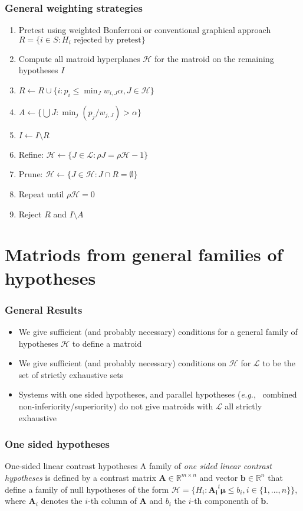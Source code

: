 \documentclass[bigger]{beamer}
\newcommand{\bs}[1]{\bm{#1}}
\newcommand{\eg}{{\em e.g.},~}
\begin{document}
\begin{frame}
\frametitle{General weighting strategies}

\begin{enumerate}
\item Pretest using weighted Bonferroni or conventional graphical
  approach $R = \{i \in S: H_i \textrm{ rejected by pretest}\}$
\item Compute all matroid hyperplanes $\mathscr{H}$ for the matroid on
  the remaining hypotheses $I$
\item $R \gets R \cup \{i: p_i \leq \min_J w_{i,J} \alpha, J \in \mathscr{H}\}$
\item $A \gets \{\bigcup J: \min_j (p_j / w_{j,J}) > \alpha\}$ 
\item $I \gets I \setminus R$
\item Refine: $\mathscr{H} \gets \{J\in \mathscr{L}: \rho J = \rho
  \mathscr{H} - 1\}$ 
\item Prune: $\mathscr{H} \gets \{J \in \mathscr{H}: J \cap R = \emptyset\}$
\item Repeat until $\rho \mathscr {H} = 0$
\item Reject $R$ and $I \setminus A$
\end{enumerate}
\end{frame}
\section{Matriods from general families of hypotheses}



\begin{frame}
\frametitle{General Results}
\begin{itemize}
\item We give sufficient (and probably necessary) conditions for a
  general family of hypotheses $\mathscr{H}$ to define a matroid
\item We give sufficient (and probably necessary) conditions on
  $\mathscr{H}$ for $\mathscr{L}$ to be the set of strictly exhaustive
  sets
\item Systems with one sided hypotheses, and parallel hypotheses (\eg
  combined non-inferiority/superiority) do not give matroids with
  $\mathscr{L}$ all strictly exhaustive 
\end{itemize}


\end{frame}

\begin{frame}
  \frametitle{One sided hypotheses}
  \begin{block}{One-sided linear contrast hypotheses}
    A family of {\em one sided linear contrast hypotheses} is defined
    by a contrast matrix $\bs{A} \in \mathbb{R}^{m\times n}$ and
    vector $\bs{b} \in \mathbb{R}^n$ that define a  family of null
    hypotheses of the form $\mathscr{H} = \{H_i: \bs{A_i}^t\bs{\mu}
    \leq b_i,i \in \{1,...,n\}\}$, where $\bs{A}_i$ denotes the $i$-th
    column of $\bs{A}$ and $b_i$ the $i$-th componenth of $\bs{b}$.
  \end{block}
\end{frame}
\end{document}

